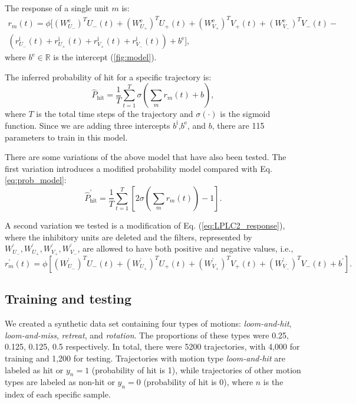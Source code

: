 \documentclass[pdftex,9pt,lineno]{elife}
\let\hat\widehat
\begin{document}
The response of a single unit $m$ is:
\begin{multline}\label{eq:LPLC2_response}
r_{m}(t) = \phi \Bigg[ (W^{\text{e}}_{U_{-}})^{T}U_{-}(t)+(W^{\text{e}}_{U_{+}})^{T}U_{+}(t)+(W^{\text{e}}_{V_{+}})^{T}V_{+}(t)+(W^{\text{e}}_{V_{-}})^{T}V_{-}(t)- \\
\left(r^{\text{i}}_{U_{-}}(t)+r^{\text{i}}_{U_{+}}(t)+r^{\text{i}}_{V_{+}}(t)+r^{\text{i}}_{V_{-}}(t)\right)+b^{\text{e}} \Bigg],
\end{multline}
where $b^{\text{e}} \in \mathbb{R}$ is the intercept (\ref{fig:model}).

The inferred probability of hit for a specific trajectory is:
\begin{equation}
\hat{P}_{\text{hit}} =\frac{1}{T}\sum_{t=1}^{T} \sigma \left( \sum_{m}r_{m}(t)+b \right),
\label{eq:prob_model}
\end{equation}
where $T$ is the total time steps of the trajectory and $\sigma(\cdot)$ is the sigmoid function. Since we are adding three intercepts $b^{\text{i}}$,$b^{\text{e}}$, and $b$, there are 115 parameters to train in this model.

There are some variations of the above model that have also been tested. The first variation introduces a modified probability model compared with Eq. \ref{eq:prob_model}:
\begin{equation}
\hat{P}^{'}_{\text{hit}} = \frac{1}{T}\sum_{t=1}^{T}\left[ 2\sigma \left( \sum_{m}r_{m}(t) \right)-1 \right].
\label{eq:prob_model2}
\end{equation}

A second variation we tested is a modification of Eq. (\ref{eq:LPLC2_response}), where the inhibitory units are deleted and the filters, represented by $W^{\text{'}}_{U_{-}},W^{\text{'}}_{U_{+}},W^{\text{'}}_{V_{+}},W^{\text{'}}_{V_{-}}$, are allowed to have both positive and negative values, i.e.,
\begin{equation}
r_{m}^{'}(t) = \phi \left[ (W^{\text{'}}_{U_{-}})^{T}U_{-}(t)+(W^{\text{'}}_{U_{+}})^{T}U_{+}(t)+(W^{\text{'}}_{V_{+}})^{T}V_{+}(t)+(W^{\text{'}}_{V_{-}})^{T}V_{-}(t)+b^{'} \right].
\label{eq:LPLC2_response_2}
\end{equation}

\subsection{Training and testing}
We created a synthetic data set containing four types of motions: \emph{loom-and-hit}, \emph{loom-and-miss}, \emph{retreat}, and \emph{rotation}. The proportions of these types were 0.25, 0.125, 0.125, 0.5 respectively. In total, there were 5200 trajectories, with 4,000 for training and 1,200 for testing. Trajectories with motion type \emph{loom-and-hit} are labeled as hit or $y_{n}=1$ (probability of hit is 1), while trajectories of other motion types are labeled as non-hit or $y_{n}=0$ (probability of hit is 0), where $n$ is the index of each specific sample.
\end{document}
